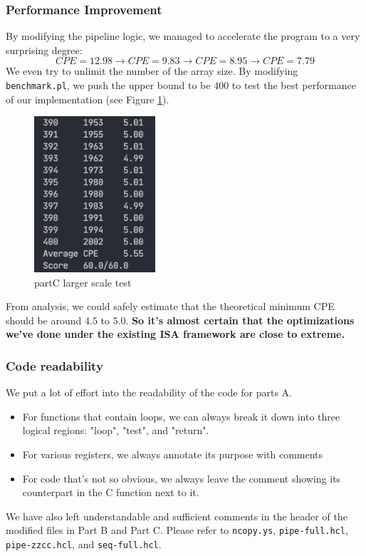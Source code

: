\documentclass{article}
\begin{document}
\subsubsection{Performance Improvement}
By modifying the pipeline logic, we managed to accelerate the program to a very surprising degree:
$$
        CPE = 12.98 \rightarrow CPE = 9.83 \rightarrow CPE = 8.95 \rightarrow CPE = 7.79
$$
We even try to unlimit the number of the array size. By modifying \texttt{benchmark.pl}, 
we push the upper bound to be 400 to test the best performance of our implementation (see Figure \ref{Fig.partC-limit}).
\begin{figure}[H] %
        \centering %
        \includegraphics[width=0.4\textwidth]{partC-larger-scale-test.jpg} %
        \caption{partC larger scale test} %
        \label{Fig.partC-limit} %
\end{figure}
From analysis, we could safely estimate that the theoretical minimum CPE should be around $4.5$ to $5.0$. \textbf{So it's almost certain that the optimizations we've done under the existing ISA framework are close to extreme.}
\subsubsection{Code readability}
We put a lot of effort into the readability of the code for parts A.
\begin{itemize}
        \item For functions that contain loops, we can always break it down into three logical regions: "loop", "test", and "return".
        \item For various registers, we always annotate its purpose with comments
        \item For code that's not so obvious, we always leave the comment showing its counterpart in the C function next to it.
\end{itemize}
We have also left understandable and sufficient comments in the header of the modified files in Part B and Part C. Please refer to \texttt{ncopy.ys}, \texttt{pipe-full.hcl}, \texttt{pipe-zzcc.hcl}, and \texttt{seq-full.hcl}.
\end{document}
